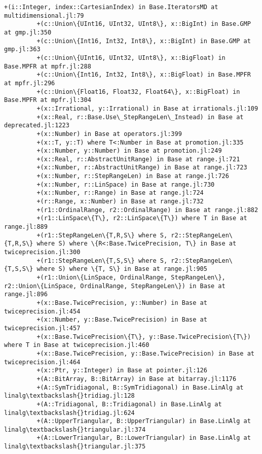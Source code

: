 \documentclass[11pt]{article}
\begin{document}
\begin{Verbatim}[commandchars=\\\{\}]
         +(i::Integer, index::CartesianIndex) in Base.IteratorsMD at multidimensional.jl:79
         +(c::Union\{UInt16, UInt32, UInt8\}, x::BigInt) in Base.GMP at gmp.jl:350
         +(c::Union\{Int16, Int32, Int8\}, x::BigInt) in Base.GMP at gmp.jl:363
         +(c::Union\{UInt16, UInt32, UInt8\}, x::BigFloat) in Base.MPFR at mpfr.jl:288
         +(c::Union\{Int16, Int32, Int8\}, x::BigFloat) in Base.MPFR at mpfr.jl:296
         +(c::Union\{Float16, Float32, Float64\}, x::BigFloat) in Base.MPFR at mpfr.jl:304
         +(x::Irrational, y::Irrational) in Base at irrationals.jl:109
         +(x::Real, r::Base.Use\_StepRangeLen\_Instead) in Base at deprecated.jl:1223
         +(x::Number) in Base at operators.jl:399
         +(x::T, y::T) where T<:Number in Base at promotion.jl:335
         +(x::Number, y::Number) in Base at promotion.jl:249
         +(x::Real, r::AbstractUnitRange) in Base at range.jl:721
         +(x::Number, r::AbstractUnitRange) in Base at range.jl:723
         +(x::Number, r::StepRangeLen) in Base at range.jl:726
         +(x::Number, r::LinSpace) in Base at range.jl:730
         +(x::Number, r::Range) in Base at range.jl:724
         +(r::Range, x::Number) in Base at range.jl:732
         +(r1::OrdinalRange, r2::OrdinalRange) in Base at range.jl:882
         +(r1::LinSpace\{T\}, r2::LinSpace\{T\}) where T in Base at range.jl:889
         +(r1::StepRangeLen\{T,R,S\} where S, r2::StepRangeLen\{T,R,S\} where S) where \{R<:Base.TwicePrecision, T\} in Base at twiceprecision.jl:300
         +(r1::StepRangeLen\{T,S,S\} where S, r2::StepRangeLen\{T,S,S\} where S) where \{T, S\} in Base at range.jl:905
         +(r1::Union\{LinSpace, OrdinalRange, StepRangeLen\}, r2::Union\{LinSpace, OrdinalRange, StepRangeLen\}) in Base at range.jl:896
         +(x::Base.TwicePrecision, y::Number) in Base at twiceprecision.jl:454
         +(x::Number, y::Base.TwicePrecision) in Base at twiceprecision.jl:457
         +(x::Base.TwicePrecision\{T\}, y::Base.TwicePrecision\{T\}) where T in Base at twiceprecision.jl:460
         +(x::Base.TwicePrecision, y::Base.TwicePrecision) in Base at twiceprecision.jl:464
         +(x::Ptr, y::Integer) in Base at pointer.jl:126
         +(A::BitArray, B::BitArray) in Base at bitarray.jl:1176
         +(A::SymTridiagonal, B::SymTridiagonal) in Base.LinAlg at linalg\textbackslash{}tridiag.jl:128
         +(A::Tridiagonal, B::Tridiagonal) in Base.LinAlg at linalg\textbackslash{}tridiag.jl:624
         +(A::UpperTriangular, B::UpperTriangular) in Base.LinAlg at linalg\textbackslash{}triangular.jl:374
         +(A::LowerTriangular, B::LowerTriangular) in Base.LinAlg at linalg\textbackslash{}triangular.jl:375

\end{Verbatim}
\end{document}
